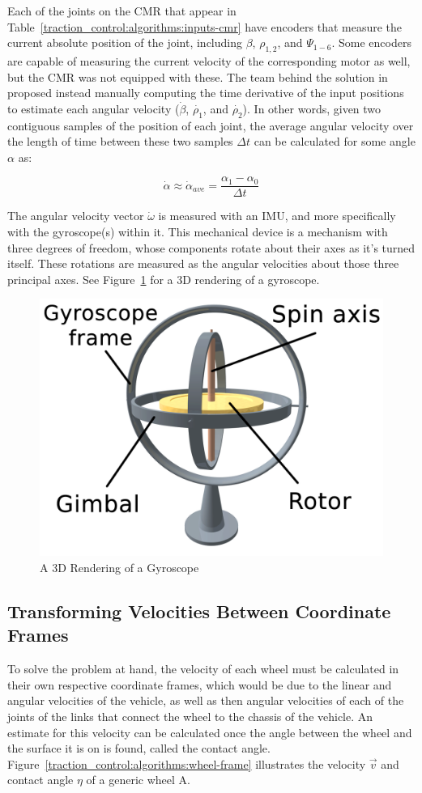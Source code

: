Each of the joints on the \ac{CMR} that appear in Table~\ref{traction_control:algorithms:inputs-cmr} have encoders that measure the current absolute position of the joint, including $\beta$, $\rho_{1,2}$, and $\Psi_{1-6}$. Some encoders are capable of measuring the current velocity of the corresponding motor as well, but the \ac{CMR} was not equipped with these. The team behind the solution in \cite{tractl} proposed instead manually computing the time derivative of the input positions to estimate each angular velocity ($\dot{\beta}$, $\dot{\rho_{1}}$, and $\dot{\rho_{2}}$). In other words, given two contiguous samples of the position of each joint, the average angular velocity over the length of time between these two samples $\Delta t$ can be calculated for some angle $\alpha$ as:

\begin{equation}
	\dot{\alpha} \approx \dot{\alpha}_{ave} = \frac{\alpha_{1} - \alpha_{0}}{\Delta t}
\end{equation}

The angular velocity vector $\dot{\omega}$ is measured with an \ac{IMU}, and more specifically with the gyroscope(s) within it. This mechanical device is a mechanism with three degrees of freedom, whose components rotate about their axes as it's turned itself. These rotations are measured as the angular velocities about those three principal axes. See Figure~\ref{traction_control:algorithms:gyro} for a 3D rendering of a gyroscope.

\begin{figure}[H]
	\centering
	\includegraphics[width=.35\textwidth]{sections/algorithms/images/gyroscope.png}
	\caption{A 3D Rendering of a Gyroscope}
	\label{traction_control:algorithms:gyro}
\end{figure}

\subsection{Transforming Velocities Between Coordinate Frames}
To solve the problem at hand, the velocity of each wheel must be calculated in their own respective coordinate frames, which would be due to the linear and angular velocities of the vehicle, as well as then angular velocities of each of the joints of the links that connect the wheel to the chassis of the vehicle. An estimate for this velocity can be calculated once the angle between the wheel and the surface it is on is found, called the contact angle. Figure~\ref{traction_control:algorithms:wheel-frame} illustrates the velocity $\vec{v}$ and contact angle $\eta$ of a generic wheel A. \\


